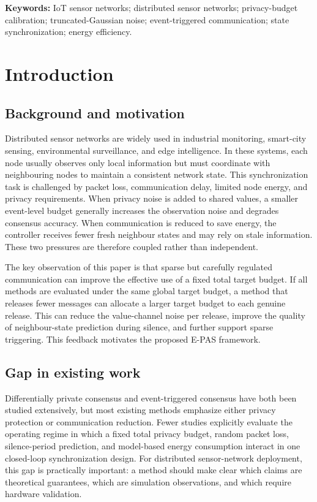 \documentclass[10pt]{article}
\newcommand{\EPAS}{E-PAS}
\begin{document}
\noindent\textbf{Keywords:} IoT sensor networks; distributed sensor networks; privacy-budget calibration; truncated-Gaussian noise; event-triggered communication; state synchronization; energy efficiency.




\section{Introduction}\label{sec:introduction}

\subsection{Background and motivation}

Distributed sensor networks are widely used in industrial monitoring, smart-city sensing, environmental surveillance, and edge intelligence. In these systems, each node usually observes only local information but must coordinate with neighbouring nodes to maintain a consistent network state. This synchronization task is challenged by packet loss, communication delay, limited node energy, and privacy requirements. When privacy noise is added to shared values, a smaller event-level budget generally increases the observation noise and degrades consensus accuracy. When communication is reduced to save energy, the controller receives fewer fresh neighbour states and may rely on stale information. These two pressures are therefore coupled rather than independent.

The key observation of this paper is that sparse but carefully regulated communication can improve the effective use of a fixed total target budget. If all methods are evaluated under the same global target budget, a method that releases fewer messages can allocate a larger target budget to each genuine release. This can reduce the value-channel noise per release, improve the quality of neighbour-state prediction during silence, and further support sparse triggering. This feedback motivates the proposed \EPAS{} framework.

\subsection{Gap in existing work}

Differentially private consensus and event-triggered consensus have both been studied extensively, but most existing methods emphasize either privacy protection or communication reduction. Fewer studies explicitly evaluate the operating regime in which a fixed total privacy budget, random packet loss, silence-period prediction, and model-based energy consumption interact in one closed-loop synchronization design. For distributed sensor-network deployment, this gap is practically important: a method should make clear which claims are theoretical guarantees, which are simulation observations, and which require hardware validation.
\end{document}
